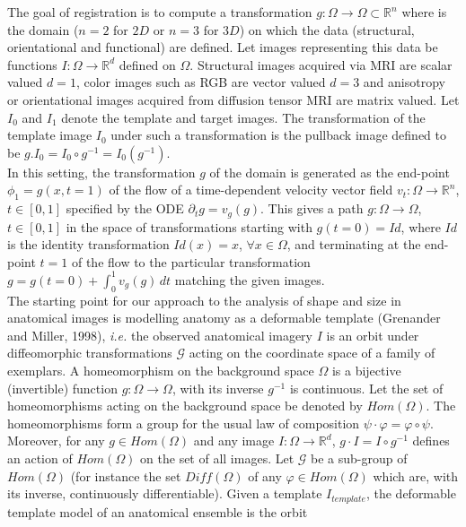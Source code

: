\documentclass[final, paper=letter,5p,times,twocolumn]{elsarticle}
\theoremstyle{definition}
\begin{document}
{The goal of registration is to compute a transformation $g:\Omega \rightarrow \Omega \subset \mathbb{R}^{n}$ where is the domain ($n = 2$ for $2D$ or $n = 3$ for $3D$) on which the data (structural, orientational and functional) are defined. Let images representing this data be functions $I: \Omega \rightarrow \mathbb{R}^{d}$ defined on $\Omega$. Structural images acquired via MRI are scalar valued $d = 1$, color images such as RGB are vector valued $d = 3$ and anisotropy or orientational images acquired from diffusion tensor MRI are matrix valued. Let $I_{0}$ and $I_{1}$ denote the template and target images. The transformation of the template image $I_{0}$ under such a transformation is the pullback image defined to be $g.I_{0} = I_{0} \circ g^{-1} = I_{0}(g^{-1})$.\\
In this setting, the transformation $g$ of the domain is generated as the end-point $\phi_{1} = g(x,t=1)$ of the flow of a time-dependent velocity vector field $v_{t}: \Omega \rightarrow \mathbb{R}^{n}$, $t \in [0, 1]$ specified by the ODE $\partial_{t} g = v_{g}(g)$. This gives a path $g: \Omega \rightarrow \Omega$, $t \in [0, 1]$ in the space of transformations starting with $g(t = 0) = Id$, where $Id$ is the identity transformation $Id(x) = x$, $\forall x \in \Omega$, and terminating at the end-point $t = 1$ of the flow to the particular transformation $g = g( t = 0 ) + \int_{0}^{1} v_{g}(g) \, dt$ matching the given images.\\
The  starting  point  for  our approach to the analysis of shape and size in anatomical images is modelling anatomy  as  a  deformable  template  (Grenander  and Miller, 1998), {\it i.e.} the observed anatomical imagery $I$ is an orbit under diffeomorphic transformations $\mathcal{G}$ acting on the coordinate space of a family of exemplars. A homeomorphism on the background space $\Omega$ is a bijective (invertible) function $g: \Omega \rightarrow \Omega$, with its inverse $g^{-1}$ is continuous. Let the set of homeomorphisms acting on the background space be denoted by $Hom(\Omega)$. The homeomorphisms form a group for the usual law of composition $\psi \cdot \varphi = \varphi \circ \psi$. Moreover, for any $g \in Hom(\Omega)$ and any image $I: \Omega \rightarrow \mathbb{R}^{d}$, $g \cdot I = I \circ g^{-1}$ defines an action of $Hom(\Omega)$ on the set of all images. Let $\mathcal{G}$ be a sub-group of $Hom(\Omega)$ (for instance the set $Diff(\Omega)$ of any $\varphi \in Hom(\Omega)$ which are, with its inverse, continuously differentiable). Given a template $I_{template}$, the deformable template model of an anatomical ensemble is the orbit

}
\end{document}
